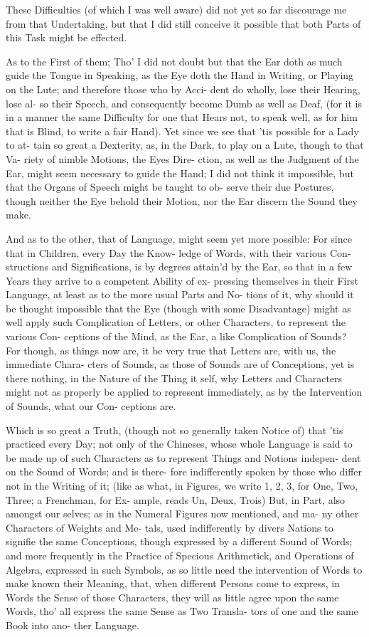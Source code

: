 These Difficulties (of which I was well
aware) did not yet so far discourage me
from that Undertaking, but that I did still
conceive it possible that both Parts of this
Task might be effected.

As to the First of them; Tho' I did not
doubt but that the Ear doth as much guide
the Tongue in Speaking, as the Eye doth
the Hand in Writing, or Playing on the
Lute; and therefore those who by Acci-
dent do wholly, lose their Hearing, lose al-
so their Speech, and consequently become
Dumb as well as Deaf, (for it is in a
manner the same Difficulty for one that
Hears not, to speak well, as for him that
is Blind, to write a fair Hand). Yet since
we see that 'tis possible for a Lady to at-
tain so great a Dexterity, as, in the Dark,
to play on a Lute, though to that Va-
riety of nimble Motions, the Eyes Dire-
ction, as well as the Judgment of the Ear,
might seem necessary to guide the Hand;
I did not think it impossible, but that the
Organs of Speech might be taught to ob-
serve their due Postures, though neither
the Eye behold their Motion, nor the Ear
discern the Sound they make.

And as to the other, that of Language,
might seem yet more possible: For since
that in Children, every Day the Know-
ledge of Words, with their various Con-
structions and Significations, is by degrees
attain'd by the Ear, so that in a few Years
they arrive to a competent Ability of ex-
pressing themselves in their First Language,
at least as to the more usual Parts and No-
tions of it, why should it be thought
impossible that the Eye (though with
some Disadvantage) might as well apply
such Complication of Letters, or other
Characters, to represent the various Con-
ceptions of the Mind, as the Ear, a like
Complication of Sounds? For though,
as things now are, it be very true that
Letters are, with us, the immediate Chara-
cters of Sounds, as those of Sounds are of
Conceptions, yet is there nothing, in the
Nature of the Thing it self, why Letters
and Characters might not as properly be
applied to represent immediately, as by
the Intervention of Sounds, what our Con-
ceptions are.

Which is so great a Truth, (though
not so generally taken Notice of) that
'tis practiced every Day; not only of the
Chineses, whose whole Language is said
to be made up of such Characters as to
represent Things and Notions indepen-
dent on the Sound of Words; and is there-
fore indifferently spoken by those who
differ not in the Writing of it; (like as
what, in Figures, we write 1, 2, 3, for
One, Two, Three; a Frenchman, for Ex-
ample, reads Un, Deux, Trois) But, in
Part, also amongst our selves; as in the
Numeral Figures now mentioned, and ma-
ny other Characters of Weights and Me-
tals, used indifferently by divers Nations
to signifie the same Conceptions, though
expressed by a different Sound of Words;
and more frequently in the Practice of
Specious Arithmetick, and Operations of
Algebra, expressed in such Symbols, as so
little need the intervention of Words to
make known their Meaning, that, when
different Persons come to express, in Words
the Sense of those Characters, they will as
little agree upon the same Words, tho'
all express the same Sense as Two Transla-
tors of one and the same Book into ano-
ther Language.

